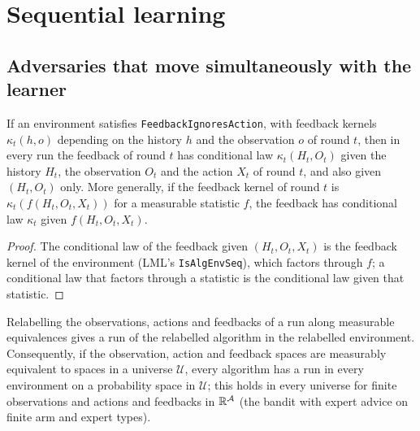 \chapter{Sequential learning}
\label{chap:prereq_sequential}

\section{Adversaries that move simultaneously with the learner}

\begin{lemma}
  \label{lem:feedback_ignores_action_cond}
  \leanok
  If an environment satisfies \texttt{FeedbackIgnoresAction}, with feedback kernels
  $\kappa_t(h, o)$ depending on the history $h$ and the observation $o$ of round $t$, then in every
  run the feedback of round $t$ has conditional law $\kappa_t(H_t, O_t)$ given the history $H_t$,
  the observation $O_t$ and the action $X_t$ of round $t$, and also given $(H_t, O_t)$ only. More
  generally, if the feedback kernel of round $t$ is $\kappa_t(f(H_t, O_t, X_t))$ for a measurable
  statistic $f$, the feedback has conditional law $\kappa_t$ given $f(H_t, O_t, X_t)$.
\end{lemma}

\begin{proof}
  \leanok
  The conditional law of the feedback given $(H_t, O_t, X_t)$ is the feedback kernel of the
  environment (LML's \texttt{IsAlgEnvSeq}), which factors through $f$; a conditional law that
  factors through a statistic is the conditional law given that statistic.
\end{proof}

\begin{lemma}
  \label{lem:exists_run_universe}
  \leanok
  Relabelling the observations, actions and feedbacks of a run along measurable equivalences gives
  a run of the relabelled algorithm in the relabelled environment. Consequently, if the
  observation, action and feedback spaces are measurably equivalent to spaces in a universe
  $\mathcal{U}$, every algorithm has a run in every environment on a probability space in
  $\mathcal{U}$; this holds in every universe for finite observations and actions and feedbacks in
  $\mathbb{R}^{\mathcal{A}}$ (the bandit with expert advice on finite arm and expert types).
\end{lemma}

